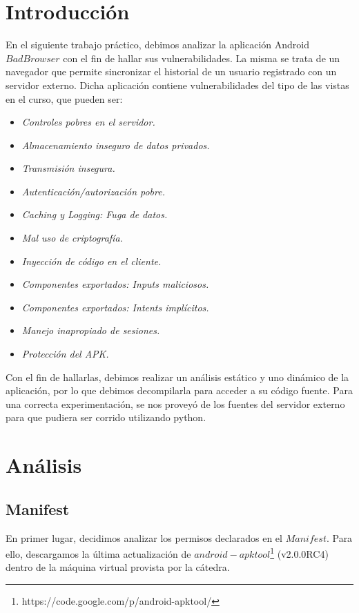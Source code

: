 \documentclass[10pt, a4paper]{article}
\begin{document}
\section{Introducción}
En el siguiente trabajo práctico, debimos analizar la aplicación Android $BadBrowser$ con el fin de hallar sus vulnerabilidades. La misma se trata de un navegador que permite sincronizar el historial de un usuario registrado con un servidor externo. Dicha aplicación contiene vulnerabilidades del tipo de las vistas en el curso, que pueden ser:
\begin{itemize}
\item \textit{Controles pobres en el servidor.}
\item \textit{Almacenamiento inseguro de datos privados.}
\item \textit{Transmisión insegura.}
\item \textit{Autenticación/autorización pobre.}
\item \textit{Caching y Logging: Fuga de datos.}
\item \textit{Mal uso de criptografía.}
\item \textit{Inyección de código en el cliente.}
\item \textit{Componentes exportados: Inputs maliciosos.}
\item \textit{Componentes exportados: Intents implícitos.}
\item \textit{Manejo inapropiado de sesiones.}
\item \textit{Protección del APK.}
\end{itemize}

Con el fin de hallarlas, debimos realizar un análisis estático y uno dinámico de la aplicación, por lo que debimos decompilarla para acceder a su código fuente. Para una correcta experimentación, se nos proveyó de los fuentes del servidor externo para que pudiera ser corrido utilizando python.

\newpage
\section{Análisis}

\subsection{Manifest}

En primer lugar, decidimos analizar los permisos declarados en el $Manifest$. Para ello, descargamos la última actualización de $android-apktool$\footnote{https://code.google.com/p/android-apktool/} (v2.0.0RC4) dentro de la máquina virtual provista por la cátedra.
\end{document}
